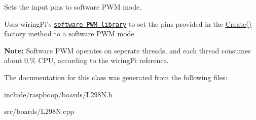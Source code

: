 Sets the input pins to software P\-W\-M mode. 

Uses wiring\-Pi's \href{http://wiringpi.com/
reference/software-pwm-library/}{\tt software P\-W\-M library} to set the pins provided in the \hyperlink{classraspboop_1_1L298N_a57ef1c025baf2584f326722196c1a35b}{Create()} factory method to a software P\-W\-M mode

{\bfseries Note\-:} Software P\-W\-M operates on seperate threads, and each thread consumes about 0.\% C\-P\-U, according to the wiring\-Pi reference. 

The documentation for this class was generated from the following files\-:\begin{DoxyCompactItemize}
\item 
include/raspboop/boards/L298\-N.\-h\item 
src/boards/L298\-N.\-cpp\end{DoxyCompactItemize}
